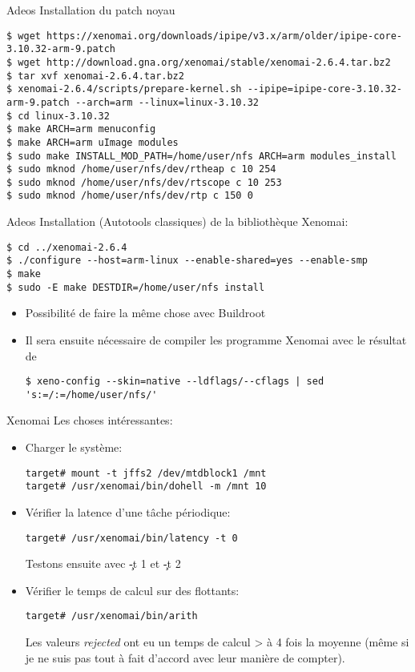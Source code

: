 \begin{frame}[fragile=singleslide]{Adeos}
  Installation du patch noyau
  \begin{lstlisting}
$ wget https://xenomai.org/downloads/ipipe/v3.x/arm/older/ipipe-core-3.10.32-arm-9.patch
$ wget http://download.gna.org/xenomai/stable/xenomai-2.6.4.tar.bz2
$ tar xvf xenomai-2.6.4.tar.bz2
$ xenomai-2.6.4/scripts/prepare-kernel.sh --ipipe=ipipe-core-3.10.32-arm-9.patch --arch=arm --linux=linux-3.10.32
$ cd linux-3.10.32
$ make ARCH=arm menuconfig
$ make ARCH=arm uImage modules
$ sudo make INSTALL_MOD_PATH=/home/user/nfs ARCH=arm modules_install
$ sudo mknod /home/user/nfs/dev/rtheap c 10 254
$ sudo mknod /home/user/nfs/dev/rtscope c 10 253
$ sudo mknod /home/user/nfs/dev/rtp c 150 0
  \end{lstlisting}
\end{frame}

\begin{frame}[fragile=singleslide]{Adeos}
  Installation (Autotools classiques) de la bibliothèque Xenomai:
  \begin{lstlisting}
$ cd ../xenomai-2.6.4
$ ./configure --host=arm-linux --enable-shared=yes --enable-smp
$ make
$ sudo -E make DESTDIR=/home/user/nfs install
  \end{lstlisting}
  \begin{itemize}
  \item   Possibilité de faire la même chose avec Buildroot
  \item Il  sera ensuite nécessaire de compiler  les programme Xenomai
    avec le résultat de
    \begin{lstlisting}
$ xeno-config --skin=native --ldflags/--cflags | sed 's:=/:=/home/user/nfs/'
    \end{lstlisting} 
  \end{itemize} 
\end{frame}

\begin{frame}[fragile=singleslide]{Xenomai}
  Les choses intéressantes:
  \begin{itemize}
  \item Charger le système:
    \begin{lstlisting}
target# mount -t jffs2 /dev/mtdblock1 /mnt
target# /usr/xenomai/bin/dohell -m /mnt 10
    \end{lstlisting}
  \item Vérifier la latence d'une tâche périodique:
    \begin{lstlisting}
target# /usr/xenomai/bin/latency -t 0
    \end{lstlisting}
    Testons ensuite avec \c{-t 1} et \c{-t 2}
  \item Vérifier le temps de calcul sur des flottants:
    \begin{lstlisting}
target# /usr/xenomai/bin/arith
    \end{lstlisting}
    Les valeurs \emph{rejected}  ont eu un temps de calcul  > à 4 fois
    la moyenne (même si je ne  suis pas tout à fait d'accord avec leur
    manière de compter).
  \end{itemize}
\end{frame}

